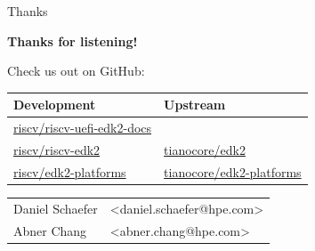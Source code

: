 \documentclass[
  10pt
]{beamer}
\begin{document}
\begin{frame}{Thanks}
  \begin{center}
    \textbf{Thanks for listening!}
  \end{center}

  \vfill

  Check us out on GitHub: \\

  \begin{tabular}{ll}
    Development & Upstream \\
    \hline
    \href{https://github.com/riscv/riscv-uefi-edk2-docs}{riscv/riscv-uefi-edk2-docs} \\
    \href{https://github.com/riscv/riscv-edk2}{riscv/riscv-edk2} & \href{https://github.com/tianocore/edk2}{tianocore/edk2} \\
    \href{https://github.com/riscv/riscv-edk2-platforms}{riscv/edk2-platforms} & \href{https://github.com/tianocore/edk2-platforms}{tianocore/edk2-platforms} \\
  \end{tabular}

  \vfill

  \begin{tabular}{ll}
    Daniel Schaefer & <daniel.schaefer@hpe.com> \\
    Abner Chang     & <abner.chang@hpe.com> \\
  \end{tabular}
\end{frame}

\end{document}
